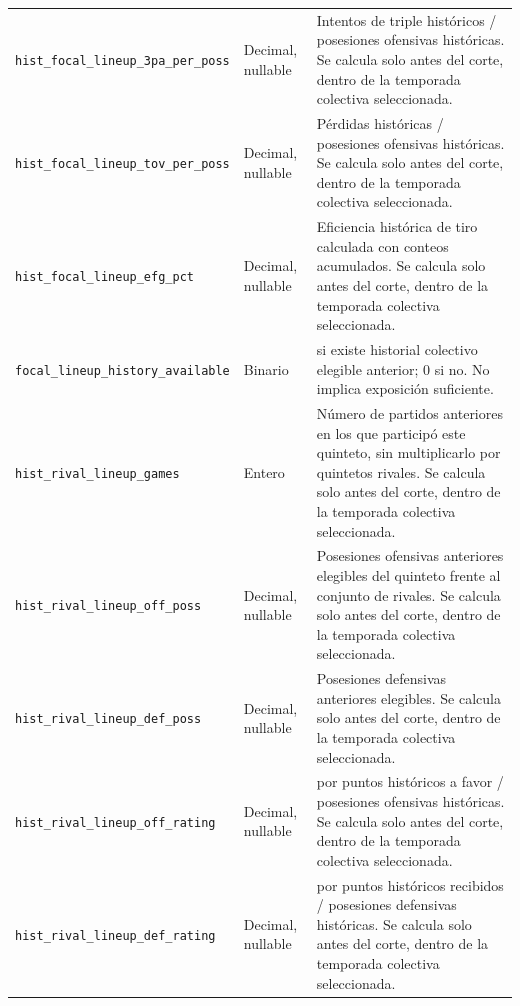 \begin{longtable}{@{}>{\raggedright\arraybackslash}p{5.0cm}>{\raggedright\arraybackslash}p{1.9cm}>{\raggedright\arraybackslash}p{7.7cm}@{}}
\texttt{hist\_\allowbreak focal\_\allowbreak lineup\_\allowbreak 3pa\_\allowbreak per\_\allowbreak poss} & Decimal, nullable & Intentos de triple históricos / posesiones ofensivas históricas. Se calcula solo antes del corte, dentro de la temporada colectiva seleccionada.\\
\texttt{hist\_\allowbreak focal\_\allowbreak lineup\_\allowbreak tov\_\allowbreak per\_\allowbreak poss} & Decimal, nullable & Pérdidas históricas / posesiones ofensivas históricas. Se calcula solo antes del corte, dentro de la temporada colectiva seleccionada.\\
\texttt{hist\_\allowbreak focal\_\allowbreak lineup\_\allowbreak efg\_\allowbreak pct} & Decimal, nullable & Eficiencia histórica de tiro calculada con conteos acumulados. Se calcula solo antes del corte, dentro de la temporada colectiva seleccionada.\\
\texttt{focal\_\allowbreak lineup\_\allowbreak history\_\allowbreak available} & Binario & 1 si existe historial colectivo elegible anterior; 0 si no. No implica exposición suficiente.\\
\texttt{hist\_\allowbreak rival\_\allowbreak lineup\_\allowbreak games} & Entero & Número de partidos anteriores en los que participó este quinteto, sin multiplicarlo por quintetos rivales. Se calcula solo antes del corte, dentro de la temporada colectiva seleccionada.\\
\texttt{hist\_\allowbreak rival\_\allowbreak lineup\_\allowbreak off\_\allowbreak poss} & Decimal, nullable & Posesiones ofensivas anteriores elegibles del quinteto frente al conjunto de rivales. Se calcula solo antes del corte, dentro de la temporada colectiva seleccionada.\\
\texttt{hist\_\allowbreak rival\_\allowbreak lineup\_\allowbreak def\_\allowbreak poss} & Decimal, nullable & Posesiones defensivas anteriores elegibles. Se calcula solo antes del corte, dentro de la temporada colectiva seleccionada.\\
\texttt{hist\_\allowbreak rival\_\allowbreak lineup\_\allowbreak off\_\allowbreak rating} & Decimal, nullable & 100 por puntos históricos a favor / posesiones ofensivas históricas. Se calcula solo antes del corte, dentro de la temporada colectiva seleccionada.\\
\texttt{hist\_\allowbreak rival\_\allowbreak lineup\_\allowbreak def\_\allowbreak rating} & Decimal, nullable & 100 por puntos históricos recibidos / posesiones defensivas históricas. Se calcula solo antes del corte, dentro de la temporada colectiva seleccionada.\\

\end{longtable}
